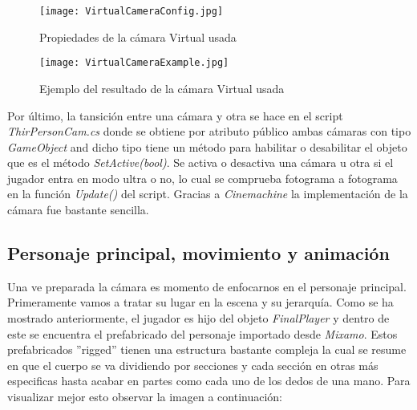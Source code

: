 
   

\begin{figure}[H]
    \centering
    \texttt{[image: VirtualCameraConfig.jpg]}
    \caption{Propiedades de la cámara Virtual usada}
\end{figure}
\begin{figure}[H]
    \centering
    \texttt{[image: VirtualCameraExample.jpg]}
    \caption{Ejemplo del resultado de la cámara Virtual usada}
\end{figure}

Por último, la tansición entre una cámara y otra se hace en el script \textit{ThirPersonCam.cs} donde se obtiene por atributo público ambas cámaras con tipo \textit{GameObject} and dicho tipo tiene un método para habilitar o desabilitar el objeto que es el método \textit{SetActive(bool)}. Se activa o desactiva una cámara u otra si el jugador entra en modo ultra o no, lo cual se comprueba fotograma a fotograma en la función \textit{Update()} del script. Gracias a \textit{Cinemachine} la implementación de la cámara fue bastante sencilla.

\subsection{Personaje principal, movimiento y animación} 

Una ve preparada la cámara es momento de enfocarnos en el personaje principal. Primeramente vamos a tratar su lugar en la escena y su jerarquía. Como se ha mostrado anteriormente, el jugador es hijo del objeto \textit{FinalPlayer} y dentro de este se encuentra el prefabricado del personaje importado desde \textit{Mixamo}. Estos prefabricados ''rigged'' tienen una estructura bastante compleja la cual se resume en que el cuerpo se va dividiendo por secciones y cada sección en otras más especificas hasta acabar en partes como cada uno de los dedos de una mano. Para visualizar mejor esto observar la imagen a continuación: 

